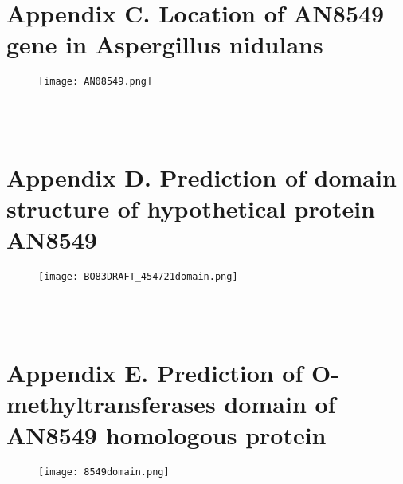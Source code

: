 \documentclass[a4paper,10pt]{article}
\begin{document}
\begin{appendices}
~\\
~\\
~\\
~\\
\section*{Appendix C. Location of AN8549 gene in Aspergillus nidulans}\label{secC}

\begin{figure}[H]
\centering
\texttt{[image: AN08549.png]}
\end{figure}
~\\
~\\

\section*{Appendix D. Prediction of domain structure of hypothetical protein AN8549\cite{paysan2023interpro}}\label{secD}

\begin{figure}[H]
\centering
\texttt{[image: BO83DRAFT\_454721domain.png]}
\end{figure}
~\\
~\\

\section*{Appendix E. Prediction of O-methyltransferases domain of AN8549 homologous protein\cite{paysan2023interpro}}\label{secE}

\begin{figure}[H]
\centering
\texttt{[image: 8549domain.png]}
\end{figure}



\end{appendices}
\end{document}
